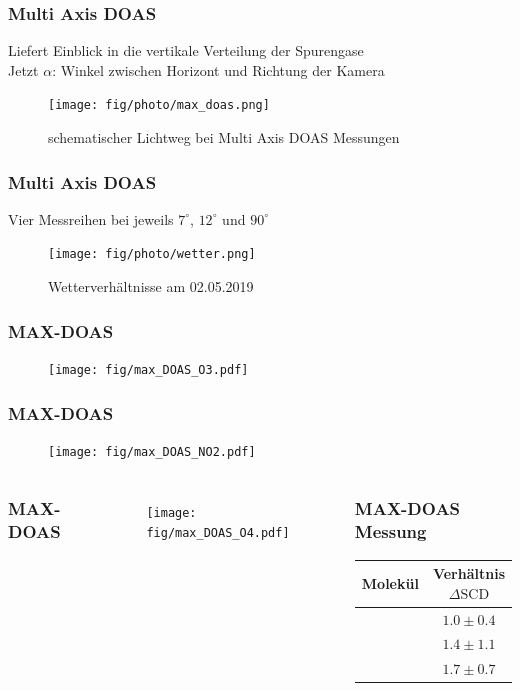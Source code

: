 \documentclass{beamer}
\begin{document}
\begin{frame}
    \frametitle{Multi Axis DOAS}
    Liefert Einblick in die vertikale Verteilung der Spurengase \\
    Jetzt $\alpha$: Winkel zwischen Horizont und Richtung der Kamera
    \begin{figure}
        \texttt{[image: fig/photo/max\_doas.png]}
        \caption{schematischer Lichtweg bei Multi Axis DOAS Messungen \cite{atm_script}}
    \end{figure}
\end{frame}

\begin{frame}
    \frametitle{Multi Axis DOAS}
    Vier Messreihen bei jeweils $7^\circ$, $12^\circ$ und $90^\circ$ \\
    \begin{figure}
    	\texttt{[image: fig/photo/wetter.png]}
    	\caption{Wetterverhältnisse am 02.05.2019}
    \end{figure}
\end{frame}

\begin{frame}
    \frametitle{MAX-DOAS }
    \begin{figure}
    	\texttt{[image: fig/max\_DOAS\_O3.pdf]}
    \end{figure}
\end{frame}

\begin{frame}
    \frametitle{MAX-DOAS }
    \begin{figure}
    	\texttt{[image: fig/max\_DOAS\_NO2.pdf]}
    \end{figure}
\end{frame}


\begin{frame}
\begin{columns}
    \frametitle{MAX-DOAS }
    \vspace{-1cm}
    \begin{figure}
    	\texttt{[image: fig/max\_DOAS\_O4.pdf]}
    \end{figure}
	\begin{center}
		\frametitle{MAX-DOAS Messung}
		\begin{tabular*}{\linewidth}{c c}
			\toprule
			Molekül & Verhältnis $\Delta \text{SCD}$ \\
			\midrule
			\ch{O3} & $1.0 \pm 0.4$ \\
			\ch{NO2} & $1.4 \pm 1.1$ \\
			\ch{O4} & $1.7 \pm 0.7$\\
			\bottomrule
		\end{tabular*}
		\label{fig:ratio_dscd}
	\end{center}
\end{columns}
\end{frame}
\end{document}
